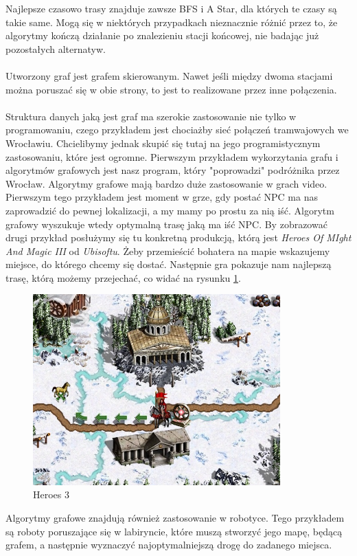 \documentclass[13pt]{article}
\begin{document}
Najlepsze czasowo trasy znajduje zawsze BFS i A Star, dla których te czasy są takie same. Mogą się w niektórych przypadkach nieznacznie różnić przez to, że algorytmy kończą działanie po znalezieniu stacji końcowej, nie badając już pozostałych alternatyw. \\\\
Utworzony graf jest grafem skierowanym. Nawet jeśli między dwoma stacjami można poruszać się w obie strony, to jest to realizowane przez inne połączenia.\\\\
Struktura danych jaką jest graf ma szerokie zastosowanie nie tylko w programowaniu, czego przykładem jest chociażby sieć połączeń tramwajowych we Wrocławiu. Chcielibymy jednak skupić się tutaj na jego programistycznym zastosowaniu, które jest ogromne. Pierwszym przykładem wykorzytania grafu i algorytmów grafowych jest nasz program, który "poprowadzi" podróżnika przez Wrocław. Algorytmy grafowe mają bardzo duże zastosowanie w grach video. Pierwszym tego przykładem jest moment w grze, gdy postać NPC ma nas zaprowadzić do pewnej lokalizacji, a my mamy po prostu za nią iść. Algorytm grafowy wyszukuje wtedy optymalną trasę jaką ma iść NPC. By zobrazować drugi przykład posłużymy się tu konkretną produkcją, którą jest \textit{Heroes Of MIght And Magic III} od  \textit{Ubisoftu}. Żeby przemieścić bohatera na mapie wskazujemy miejsce, do którego chcemy się dostać. Następnie gra pokazuje nam najlepszą trasę, którą możemy przejechać, co widać na rysunku \ref{heroes}. 
\begin{figure}[hp]
\centering
\includegraphics[width=0.85\textwidth]{heroes1.jpg}
\caption{Heroes 3 \label{heroes}}
\end{figure}
Algorytmy grafowe znajdują również zastosowanie w robotyce. Tego przykładem są roboty poruszające się w labiryncie, które muszą stworzyć jego mapę, będącą grafem, a następnie wyznaczyć najoptymalniejszą drogę do zadanego miejsca.
\end{document}
